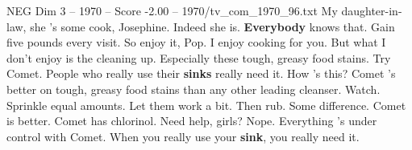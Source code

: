 \begin{textsample}{NEG Dim 3 – 1970 – Score -2.00 – 1970/tv\_com\_1970\_96.txt}  \label{ex:f3_neg_061}
My daughter-in-law, she 's some cook, Josephine.
Indeed she is. \textbf{Everybody} knows that.
Gain five pounds every visit.
So enjoy it, Pop.
I enjoy cooking for you.
But what I don't enjoy is the cleaning up.
Especially these tough, greasy food stains.
Try Comet.
People who really use their \textbf{sinks} really need it.
How 's this?
Comet 's better on tough, greasy food stains than any other leading cleanser.
Watch.
Sprinkle equal amounts.
Let them work a bit.
Then rub.
Some difference.
Comet is better.
Comet has chlorinol.
Need help, girls?
Nope.
Everything 's under control with Comet.
When you really use your \textbf{sink}, you really need it.

\end{textsample}
